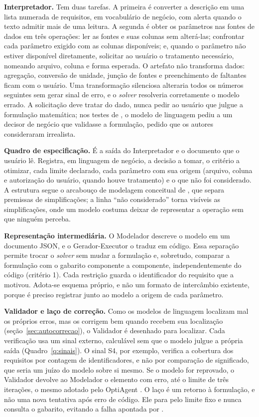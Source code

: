 \textbf{Interpretador.} Tem duas tarefas. A primeira é converter a descrição em uma lista numerada de requisitos, em vocabulário de negócio, com alerta quando o texto admitir mais de uma leitura. A segunda é obter os parâmetros nas fontes de dados em três operações: ler as fontes e suas colunas sem alterá-las; confrontar cada parâmetro exigido com as colunas disponíveis; e, quando o parâmetro não estiver disponível diretamente, solicitar ao usuário o tratamento necessário, nomeando arquivo, coluna e forma esperada. O artefato não transforma dados: agregação, conversão de unidade, junção de fontes e preenchimento de faltantes ficam com o usuário. Uma transformação silenciosa alteraria todos os números seguintes sem gerar sinal de erro, e o \textit{solver} resolveria corretamente o modelo errado. A solicitação deve tratar do dado, nunca pedir ao usuário que julgue a formulação matemática; nos testes de , o modelo de linguagem pediu a um decisor de negócio que validasse a formulação, pedido que os autores consideraram irrealista.

\textbf{Quadro de especificação.} É a saída do Interpretador e o documento que o usuário lê. Registra, em linguagem de negócio, a decisão a tomar, o critério a otimizar, cada limite declarado, cada parâmetro com sua origem (arquivo, coluna e autorização do usuário, quando houve tratamento) e o que não foi considerado. A estrutura segue o arcabouço de modelagem conceitual de , que separa premissas de simplificações; a linha ``não considerado'' torna visíveis as simplificações, onde um modelo costuma deixar de representar a operação sem que ninguém perceba.

\textbf{Representação intermediária.} O Modelador descreve o modelo em um documento JSON, e o Gerador-Executor o traduz em código. Essa separação permite trocar o \textit{solver} sem mudar a formulação e, sobretudo, comparar a formulação com o gabarito componente a componente, independentemente do código (critério 1). Cada restrição guarda o identificador do requisito que a motivou. Adota-se esquema próprio, e não um formato de intercâmbio existente, porque é preciso registrar junto ao modelo a origem de cada parâmetro.

\textbf{Validador e laço de correção.} Como os modelos de linguagem localizam mal os próprios erros, mas os corrigem bem quando recebem sua localização (seção~\ref{sec:autocorrecao}), o Validador é desenhado para localizar. Cada verificação usa um sinal externo, calculável sem que o modelo julgue a própria saída (Quadro~\ref{q:sinais}). O sinal S4, por exemplo, verifica a cobertura dos requisitos por contagem de identificadores, e não por comparação de significado, que seria um juízo do modelo sobre si mesmo. Se o modelo for reprovado, o Validador devolve ao Modelador o elemento com erro, até o limite de três iterações, o mesmo adotado pelo OptiAgent \cite{monteiro2026}. O laço é um retorno à formulação, e não uma nova tentativa após erro de código. Ele para pelo limite fixo e nunca consulta o gabarito, evitando a falha apontada por .

